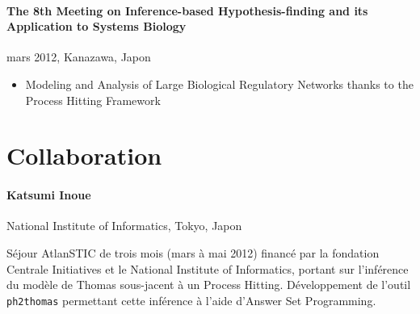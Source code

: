 \paragraph{The 8th Meeting on Inference-based Hypothesis-finding and its Application to Systems Biology}
mars 2012, Kanazawa, Japon
\begin{itemize}
\item[] Modeling and Analysis of Large Biological Regulatory Networks thanks to the Process Hitting Framework
\end{itemize}



\section{Collaboration}

\paragraph{Katsumi Inoue} National Institute of Informatics, Tokyo, Japon

Séjour AtlanSTIC de trois mois (mars à mai 2012) financé par la fondation Centrale Initiatives et le National Institute of Informatics,
portant sur l'inférence du modèle de Thomas sous-jacent à un Process Hitting.
Développement de l'outil \texttt{ph2thomas} permettant cette inférence à l'aide d'Answer Set Programming.
